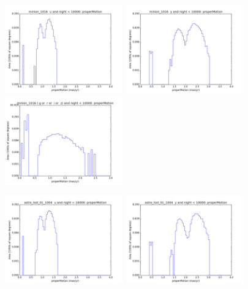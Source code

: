 \begin{figure}[ht]
  \begin{center}
  \includegraphics[width=2.0in]{./figs/milkyway/astromPanels/MW_Astrom_pmError_Baseline_u_hst.png}
  \includegraphics[width=2.0in]{./figs/milkyway/astromPanels/MW_Astrom_pmError_Baseline_y_hst.png}
  \includegraphics[width=2.0in]{./figs/milkyway/astromPanels/MW_Astrom_pmError_Baseline_10y_hst.png}
  \end{center}
  \begin{center}
  \includegraphics[width=2.0in]{./figs/milkyway/astromPanels/MW_Astrom_pmError_wfdPlane_u_hst.png}
  \includegraphics[width=2.0in]{./figs/milkyway/astromPanels/MW_Astrom_pmError_wfdPlane_y_hst.png}

\end{center}
\end{figure}
